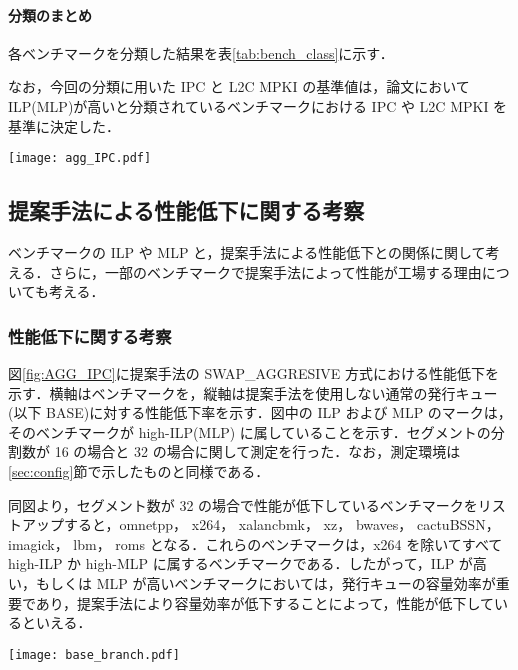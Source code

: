 \documentclass[twocolumn]{jsarticle}
\begin{document}
  \paragraph{分類のまとめ}
  各ベンチマークを分類した結果を表\ref{tab:bench_class}に示す．

  なお，今回の分類に用いた IPC と L2C MPKI の基準値は，論文\cite{Ando:2019}においてILP(MLP)が高いと分類されているベンチマークにおける IPC や L2C MPKI を基準に決定した． 

  \begin{figure*}[ht]
    \centering
    \texttt{[image: agg\_IPC.pdf]}
    \caption{提案手法(SWAP\_AGGRESIVE)による性能低下}  
    \label{fig:AGG_IPC}
  \end{figure*}
  
  \subsection{提案手法による性能低下に関する考察}
  ベンチマークの ILP や MLP と，提案手法による性能低下との関係に関して考える．さらに，一部のベンチマークで提案手法によって性能が工場する理由についても考える．

  \subsubsection{性能低下に関する考察}
  図\ref{fig:AGG_IPC}に提案手法の SWAP\_AGGRESIVE 方式における性能低下を示す．横軸はベンチマークを，縦軸は提案手法を使用しない通常の発行キュー(以下 BASE)に対する性能低下率を示す．図中の ILP および  MLP のマークは，そのベンチマークが high-ILP(MLP) に属していることを示す．セグメントの分割数が 16 の場合と 32 の場合に関して測定を行った．なお，測定環境は\ref{sec:config}節で示したものと同様である． 

  同図より，セグメント数が 32 の場合で性能が低下しているベンチマークをリストアップすると，omnetpp， x264， xalancbmk， xz， bwaves， cactuBSSN， imagick， lbm， roms となる．これらのベンチマークは，x264 を除いてすべて high-ILP か high-MLP に属するベンチマークである．したがって，ILP が高い，もしくは MLP が高いベンチマークにおいては，発行キューの容量効率が重要であり，提案手法により容量効率が低下することによって，性能が低下しているといえる．

  \begin{figure*}[ht]
    \centering
    \texttt{[image: base\_branch.pdf]}
    \caption{ベンチマークごとの分岐予測の MPKI}  
    \label{fig:base_branch}
  \end{figure*}
\end{document}
